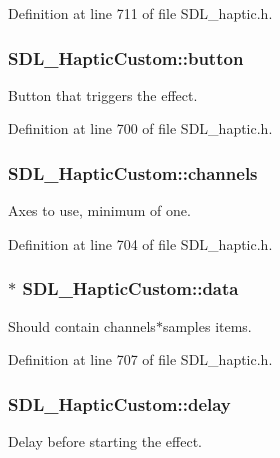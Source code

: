 Definition at line 711 of file S\-D\-L\-\_\-haptic.\-h.

\hypertarget{struct_s_d_l___haptic_custom_aa4fbaf7220f3197aa6631b3e64ad6562}{
\subsubsection[{button}]{ S\-D\-L\-\_\-\-Haptic\-Custom\-::button}}\label{struct_s_d_l___haptic_custom_aa4fbaf7220f3197aa6631b3e64ad6562}
Button that triggers the effect. 

Definition at line 700 of file S\-D\-L\-\_\-haptic.\-h.

\hypertarget{struct_s_d_l___haptic_custom_a560215762e9096d583d75867d9227cf5}{
\subsubsection[{channels}]{ S\-D\-L\-\_\-\-Haptic\-Custom\-::channels}}\label{struct_s_d_l___haptic_custom_a560215762e9096d583d75867d9227cf5}
Axes to use, minimum of one. 

Definition at line 704 of file S\-D\-L\-\_\-haptic.\-h.

\hypertarget{struct_s_d_l___haptic_custom_ad5a034f97e1699eacbe3f478538537c5}{
\subsubsection[{data}]{$\ast$ S\-D\-L\-\_\-\-Haptic\-Custom\-::data}}\label{struct_s_d_l___haptic_custom_ad5a034f97e1699eacbe3f478538537c5}
Should contain channels$\ast$samples items. 

Definition at line 707 of file S\-D\-L\-\_\-haptic.\-h.

\hypertarget{struct_s_d_l___haptic_custom_a094229466ff4cf695860db664100a2b0}{
\subsubsection[{delay}]{ S\-D\-L\-\_\-\-Haptic\-Custom\-::delay}}\label{struct_s_d_l___haptic_custom_a094229466ff4cf695860db664100a2b0}
Delay before starting the effect. 

